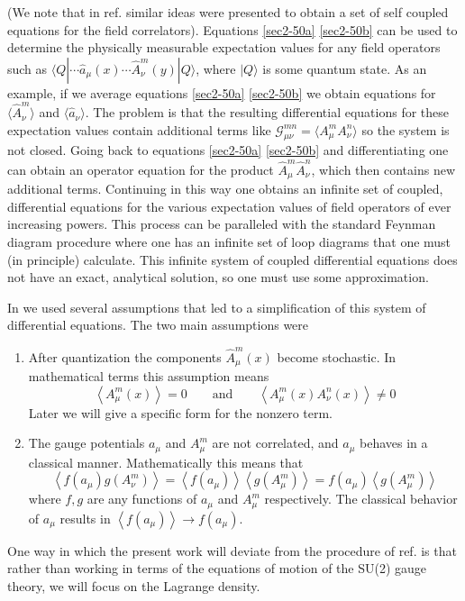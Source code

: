 \documentclass[a4paper,aps,showpacs]{revtex4}
\begin{document}
(We note that in ref. \cite{simonov} similar ideas were 
presented to obtain a set of self coupled equations for the field correlators). 
Equations \eqref{sec2-50a} \eqref{sec2-50b} can be used  to determine 
the physically measurable expectation values for any field operators such as
$\langle Q |\cdots \hat a_\mu(x) \cdots \hat A^m_\nu(y) | Q \rangle$, where
$| Q \rangle$ is some quantum state. As an example, 
if we average equations \eqref{sec2-50a} \eqref{sec2-50b} 
we obtain equations for $\langle \hat A^m_\nu \rangle$ and 
$\langle \hat a_\nu \rangle$. The problem is that the resulting 
differential equations for these expectation values contain additional
terms like $\mathcal{G}^{mn}_{\mu\nu} = \langle A^m_\mu A^n_\nu \rangle$ 
so the system is not closed. Going back to equations \eqref{sec2-50a} \eqref{sec2-50b} 
and differentiating one can obtain an operator equation for the product 
$\hat A^m_\mu \hat A^n_\nu$, which then contains new additional terms.
Continuing in this way one obtains an infinite set of coupled,
differential equations for the various expectation values of field operators
of ever increasing powers. This
process can be paralleled with the standard Feynman diagram procedure
where one has an infinite set of loop diagrams that one must (in
principle) calculate. This infinite system of coupled differential equations
does not have an exact, analytical solution, so one must use some
approximation.
\par
In \cite{dzhsin02a} we used several assumptions that led to a simplification
of this system of differential equations. The two main assumptions were 
\begin{enumerate}
  \item
  After quantization the components $\hat A^m_\mu (x)$
  become stochastic. In mathematical terms this assumption means
\begin{equation}
  \left\langle A^m_\mu (x) \right\rangle = 0
  \qquad \text{and} \qquad
  \left\langle
  A^m_\mu (x) A^n_\nu (x) \right\rangle \neq 0 
  \label{sec2-60}
\end{equation}
Later we will give a specific form for the nonzero term. 
   \item
  The gauge potentials $a_\mu$ and $A^m_\mu$ are not correlated, and
  $a_{\mu}$ behaves in a classical manner.
  Mathematically this means that
\begin{equation}
  \left\langle f(a_\mu) g(A^m_\nu) \right\rangle =
  \left\langle f(a_\mu) \right\rangle
  \left\langle g(A^m_\mu) \right\rangle =
  f(a_\mu)  \left\langle g(A^m_\mu) \right\rangle 
\label{sec2-80}
\end{equation}
  where $f,g$ are any functions of $a _{\mu}$ and $A^m _{\mu}$ respectively.
  The classical behavior of $a _{\mu}$  results in $\left\langle f(a_\mu) \right\rangle
   \rightarrow  f(a_\mu)$. 
\end{enumerate}
One way in which the present work will deviate from the procedure of ref. \cite{dzhsin02a} is
that rather than working in terms of the equations of motion of the SU(2) gauge theory, we
will focus on the Lagrange density.
\end{document}
